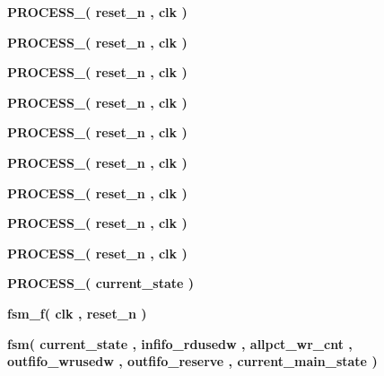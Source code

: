 \begin{DoxyCompactItemize}
\item 
{\bf P\+R\+O\+C\+E\+S\+S\+\_}{\bfseries  ( {\bfseries {\bfseries {\bf reset\+\_\+n}} \textcolor{vhdlchar}{ }} , {\bfseries {\bfseries {\bf clk}} \textcolor{vhdlchar}{ }} )}
\item 
{\bf P\+R\+O\+C\+E\+S\+S\+\_}{\bfseries  ( {\bfseries {\bfseries {\bf reset\+\_\+n}} \textcolor{vhdlchar}{ }} , {\bfseries {\bfseries {\bf clk}} \textcolor{vhdlchar}{ }} )}
\item 
{\bf P\+R\+O\+C\+E\+S\+S\+\_}{\bfseries  ( {\bfseries {\bfseries {\bf reset\+\_\+n}} \textcolor{vhdlchar}{ }} , {\bfseries {\bfseries {\bf clk}} \textcolor{vhdlchar}{ }} )}
\item 
{\bf P\+R\+O\+C\+E\+S\+S\+\_}{\bfseries  ( {\bfseries {\bfseries {\bf reset\+\_\+n}} \textcolor{vhdlchar}{ }} , {\bfseries {\bfseries {\bf clk}} \textcolor{vhdlchar}{ }} )}
\item 
{\bf P\+R\+O\+C\+E\+S\+S\+\_}{\bfseries  ( {\bfseries {\bfseries {\bf reset\+\_\+n}} \textcolor{vhdlchar}{ }} , {\bfseries {\bfseries {\bf clk}} \textcolor{vhdlchar}{ }} )}
\item 
{\bf P\+R\+O\+C\+E\+S\+S\+\_}{\bfseries  ( {\bfseries {\bfseries {\bf reset\+\_\+n}} \textcolor{vhdlchar}{ }} , {\bfseries {\bfseries {\bf clk}} \textcolor{vhdlchar}{ }} )}
\item 
{\bf P\+R\+O\+C\+E\+S\+S\+\_}{\bfseries  ( {\bfseries {\bfseries {\bf reset\+\_\+n}} \textcolor{vhdlchar}{ }} , {\bfseries {\bfseries {\bf clk}} \textcolor{vhdlchar}{ }} )}
\item 
{\bf P\+R\+O\+C\+E\+S\+S\+\_}{\bfseries  ( {\bfseries {\bfseries {\bf reset\+\_\+n}} \textcolor{vhdlchar}{ }} , {\bfseries {\bfseries {\bf clk}} \textcolor{vhdlchar}{ }} )}
\item 
{\bf P\+R\+O\+C\+E\+S\+S\+\_}{\bfseries  ( {\bfseries {\bfseries {\bf reset\+\_\+n}} \textcolor{vhdlchar}{ }} , {\bfseries {\bfseries {\bf clk}} \textcolor{vhdlchar}{ }} )}
\item 
{\bf P\+R\+O\+C\+E\+S\+S\+\_}{\bfseries  ( {\bfseries {\bfseries {\bf current\+\_\+state}} \textcolor{vhdlchar}{ }} )}
\item 
{\bf fsm\+\_\+f}{\bfseries  ( {\bfseries {\bfseries {\bf clk}} \textcolor{vhdlchar}{ }} , {\bfseries {\bfseries {\bf reset\+\_\+n}} \textcolor{vhdlchar}{ }} )}
\item 
{\bf fsm}{\bfseries  ( {\bfseries {\bfseries {\bf current\+\_\+state}} \textcolor{vhdlchar}{ }} , {\bfseries {\bfseries {\bf infifo\+\_\+rdusedw}} \textcolor{vhdlchar}{ }} , {\bfseries {\bfseries {\bf allpct\+\_\+wr\+\_\+cnt}} \textcolor{vhdlchar}{ }} , {\bfseries {\bfseries {\bf outfifo\+\_\+wrusedw}} \textcolor{vhdlchar}{ }} , {\bfseries {\bfseries {\bf outfifo\+\_\+reserve}} \textcolor{vhdlchar}{ }} , {\bfseries {\bfseries {\bf current\+\_\+main\+\_\+state}} \textcolor{vhdlchar}{ }} )}
\end{DoxyCompactItemize}
